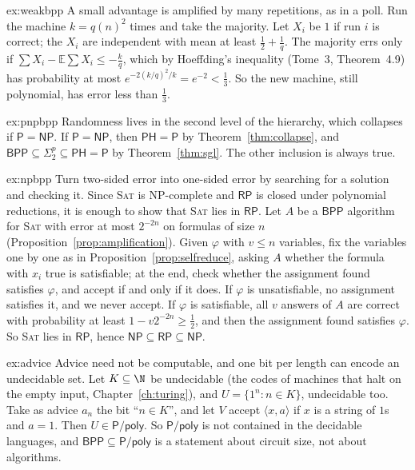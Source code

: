\begin{solution}{ex:weakbpp}
\idea A small advantage is amplified by many repetitions, as in a poll.
\writeup Run the machine $k=q(n)^2$ times and take the majority. Let $X_i$ be $1$ if run $i$ is correct; the $X_i$ are independent with mean at least $\frac12+\frac1q$. The majority errs only if $\sum X_i-\mathbb E\sum X_i\le-\frac kq$, which by Hoeffding's inequality (Tome~3, Theorem~4.9) has probability at most $e^{-2(k/q)^2/k}=e^{-2}<\frac13$. So the new machine, still polynomial, has error less than $\frac13$.
\end{solution}

\begin{solution}{ex:pnpbpp}
\idea Randomness lives in the second level of the hierarchy, which collapses if $\mathsf P=\mathsf{NP}$.
\writeup If $\mathsf P=\mathsf{NP}$, then $\mathsf{PH}=\mathsf P$ by Theorem~\ref{thm:collapse}, and $\mathsf{BPP}\subseteq\Sigma_2^p\subseteq\mathsf{PH}=\mathsf P$ by Theorem~\ref{thm:sgl}. The other inclusion is always true.
\end{solution}

\begin{solution}{ex:npbpp}
\idea Turn two-sided error into one-sided error by searching for a solution and checking it.
\writeup Since \textup{\textsc{Sat}} is NP-complete and $\mathsf{RP}$ is closed under polynomial reductions, it is enough to show that \textup{\textsc{Sat}} lies in $\mathsf{RP}$. Let $A$ be a $\mathsf{BPP}$ algorithm for \textup{\textsc{Sat}} with error at most $2^{-2n}$ on formulas of size $n$ (Proposition~\ref{prop:amplification}). Given $\varphi$ with $v\le n$ variables, fix the variables one by one as in Proposition~\ref{prop:selfreduce}, asking $A$ whether the formula with $x_i$ true is satisfiable; at the end, check whether the assignment found satisfies $\varphi$, and accept if and only if it does. If $\varphi$ is unsatisfiable, no assignment satisfies it, and we never accept. If $\varphi$ is satisfiable, all $v$ answers of $A$ are correct with probability at least $1-v2^{-2n}\ge\frac12$, and then the assignment found satisfies $\varphi$. So \textup{\textsc{Sat}} lies in $\mathsf{RP}$, hence $\mathsf{NP}\subseteq\mathsf{RP}\subseteq\mathsf{NP}$.
\end{solution}

\begin{solution}{ex:advice}
\idea Advice need not be computable, and one bit per length can encode an undecidable set.
\writeup Let $K\subseteq\N$ be undecidable (the codes of machines that halt on the empty input, Chapter~\ref{ch:turing}), and $U=\{1^n:n\in K\}$, undecidable too. Take as advice $a_n$ the bit ``$n\in K$'', and let $V$ accept $\langle x,a\rangle$ if $x$ is a string of $1$s and $a=1$. Then $U\in\mathsf P/\mathsf{poly}$. So $\mathsf P/\mathsf{poly}$ is not contained in the decidable languages, and $\mathsf{BPP}\subseteq\mathsf P/\mathsf{poly}$ is a statement about circuit size, not about algorithms.
\end{solution}

